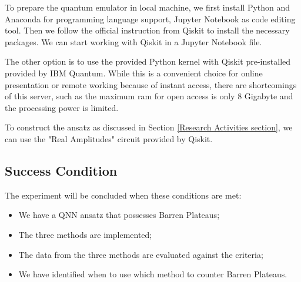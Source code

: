 To prepare the quantum emulator in local machine, we first install Python and Anaconda for programming language support, Jupyter Notebook as code editing tool.
Then we follow the official instruction from Qiskit \cite{Qiskit} to install the necessary packages.
We can start working with Qiskit in a Jupyter Notebook file.

The other option is to use the provided Python kernel with Qiskit pre-installed provided by IBM Quantum. 
While this is a convenient choice for online presentation or remote working because of instant access, there are shortcomings of this server, such as the maximum ram for open access is only 8 Gigabyte and the processing power is limited.

To construct the ansatz as discussed in Section \ref{Research Activities section}, we can use the "Real Amplitudes" circuit provided by Qiskit.


\subsection{Success Condition}
The experiment will be concluded when these conditions are met:
\begin{itemize}
    \item We have a QNN ansatz that possesses Barren Plateaus;
    \item The three methods are implemented;
    \item The data from the three methods are evaluated against the criteria;
    \item We have identified when to use which method to counter Barren Plateaus.
\end{itemize}